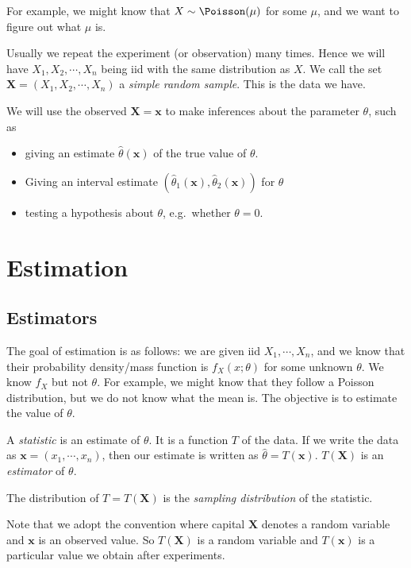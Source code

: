 \documentclass[a4paper]{article}
\begin{document}
For example, we might know that $X\sim \Poisson (\mu)$ for some $\mu$, and we want to figure out what $\mu$ is.

Usually we repeat the experiment (or observation) many times. Hence we will have $X_1, X_2, \cdots, X_n$ being iid with the same distribution as $X$. We call the set $\mathbf{X} = (X_1, X_2, \cdots, X_n)$ a \emph{simple random sample}. This is the data we have.

We will use the observed $\mathbf{X} = \mathbf{x}$ to make inferences about the parameter $\theta$, such as
\begin{itemize}
  \item giving an estimate $\hat{\theta}(\mathbf{x})$ of the true value of $\theta$.
  \item Giving an interval estimate $(\hat{\theta}_1(\mathbf{x}), \hat{\theta}_2(\mathbf{x}))$ for $\theta$
  \item testing a hypothesis about $\theta$, e.g.\ whether $\theta = 0$.
\end{itemize}
\section{Estimation}
\subsection{Estimators}
The goal of estimation is as follows: we are given iid $X_1, \cdots, X_n$, and we know that their probability density/mass function is $f_X(x; \theta)$ for some unknown $\theta$. We know $f_X$ but not $\theta$. For example, we might know that they follow a Poisson distribution, but we do not know what the mean is. The objective is to estimate the value of $\theta$.

\begin{defi}[Statistic]
  A \emph{statistic} is an estimate of $\theta$. It is a function $T$ of the data. If we write the data as $\mathbf{x} = (x_1, \cdots, x_n)$, then our estimate is written as $\hat{\theta} = T(\mathbf{x})$. $T(\mathbf{X})$ is an \emph{estimator} of $\theta$.

  The distribution of $T = T(\mathbf{X})$ is the \emph{sampling distribution} of the statistic.
\end{defi}
Note that we adopt the convention where capital $\mathbf{X}$ denotes a random variable and $\mathbf{x}$ is an observed value. So $T(\mathbf{X})$ is a random variable and $T(\mathbf{x})$ is a particular value we obtain after experiments.
\end{document}
